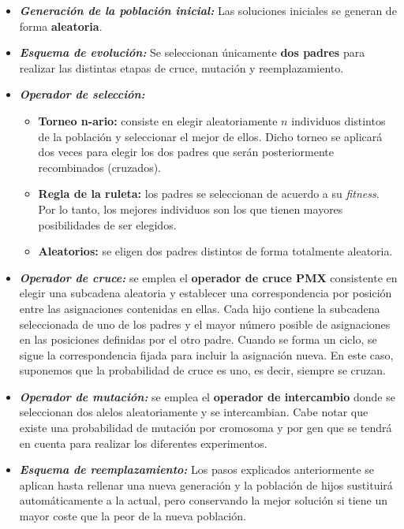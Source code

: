 \begin{itemize}
	\item \textbf{\textit{Generación de la población inicial:}} Las soluciones iniciales se generan de forma \textbf{aleatoria}.
	
	\item \textbf{\textit{Esquema de evolución:}} Se seleccionan únicamente \textbf{dos padres} para realizar las distintas etapas de cruce, mutación y reemplazamiento.
	
	\item \textbf{\textit{Operador de selección:}}
	\begin{itemize}
		\item \textbf{Torneo n-ario:} consiste en elegir aleatoriamente $n$ individuos distintos de la población y seleccionar el mejor de ellos. Dicho torneo se aplicará dos veces para elegir los dos padres que serán posteriormente recombinados (cruzados).
		\item \textbf{Regla de la ruleta:} los padres se seleccionan de acuerdo a su \textit{fitness}. Por lo tanto, los mejores individuos son los que tienen mayores posibilidades de ser elegidos. 
		\item \textbf{Aleatorios:} se eligen dos padres distintos de forma totalmente aleatoria.
	\end{itemize}
	
	\item \textbf{\textit{Operador de cruce:}} se emplea el \textbf{operador de cruce PMX} consistente en elegir una subcadena aleatoria y establecer una correspondencia por posición entre las asignaciones contenidas en ellas. Cada hijo contiene la subcadena seleccionada de uno de los padres y el mayor número posible de asignaciones en las posiciones definidas por el otro padre. Cuando se forma un ciclo, se sigue la correspondencia fijada para incluir la asignación nueva. En este caso, suponemos que la probabilidad de cruce es uno, es decir, siempre se cruzan.
	
	\item \textbf{\textit{Operador de mutación:}} se emplea el \textbf{operador de intercambio} donde se seleccionan dos alelos aleatoriamente y se intercambian. Cabe notar que existe una probabilidad de mutación por cromosoma y por gen que se tendrá en cuenta para realizar los diferentes experimentos.
	
	\item \textbf{\textit{Esquema de reemplazamiento:}} Los pasos explicados anteriormente se aplican hasta rellenar una nueva generación y la población de hijos sustituirá automáticamente a la actual, pero conservando la mejor solución si tiene un mayor coste que la peor de la nueva población.
\end{itemize}

